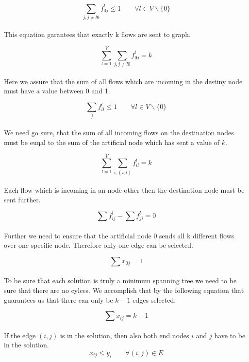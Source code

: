 \begin{equation}
  \sum_{j, j \neq l 0}  f_{0j}^l \leq 1 \qquad \forall l \in V \backslash \{0\}
\end{equation}
\\
This equation garantees that exactly k flows are sent to graph.

\begin{equation}
  \sum_{l=1}^V \sum_{j, j \neq l 0}  f_{0j}^l = k
\end{equation}
\\
Here we assure that the sum of all flows which are incoming in the destiny node must have a value between 0 and 1.

\begin{equation}
  \sum_{j}  f_{il}^l \leq 1 \qquad \forall l \in V \backslash \{0\}
\end{equation}
\\
We need go sure, that the sum of all incoming flows on the destination nodes must be euqal to the sum of the artificial node which has sent a value of $k$.

\begin{equation}
  \sum_{l=1}^V \sum_{i, (i,l)}  f_{il}^l = k
\end{equation}
\\
Each flow which is incoming in an node other then the destination node must be sent further.

\begin{equation}
  \sum  f_{ij}^l -  \sum  f_{ji}^l = 0
\end{equation}
\\
Further we need to ensure that the artificial node $0$ sends all k different flows over one specific node. Therefore only one edge can be selected.

\begin{equation}
  \sum  x_{0j} = 1
\end{equation}
\\
To be sure that each solution is truly a minimum spanning tree we need to be sure that there are no cylces. We accomplish that by the following equation that guarantees us that there can only be $k-1$ edges selected.

\begin{equation}
  \sum  x_{ij} = k-1
\end{equation}
\\
If the edge $(i,j)$ is in the solution, then also both end nodes $i$ and $j$ 
have to be in the solution.
\begin{equation}
  x_{ij} \leq y_{i} \qquad \forall (i,j) \in E
  \label{lbl:xy1}
\end{equation}

